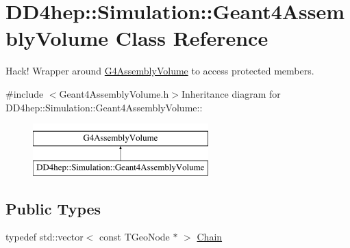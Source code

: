 \hypertarget{class_d_d4hep_1_1_simulation_1_1_geant4_assembly_volume}{
\section{DD4hep::Simulation::Geant4AssemblyVolume Class Reference}
\label{class_d_d4hep_1_1_simulation_1_1_geant4_assembly_volume}
}


Hack! Wrapper around \hyperlink{class_g4_assembly_volume}{G4AssemblyVolume} to access protected members.  


{\ttfamily \#include $<$Geant4AssemblyVolume.h$>$}Inheritance diagram for DD4hep::Simulation::Geant4AssemblyVolume::\begin{figure}[H]
\begin{center}
\leavevmode
\includegraphics[height=2cm]{class_d_d4hep_1_1_simulation_1_1_geant4_assembly_volume}
\end{center}
\end{figure}
\subsection*{Public Types}
\begin{DoxyCompactItemize}
\item 
typedef std::vector$<$ const TGeoNode $\ast$ $>$ \hyperlink{class_d_d4hep_1_1_simulation_1_1_geant4_assembly_volume_ad79481b292635c219fcc03d160689211}{Chain}
\end{DoxyCompactItemize}
